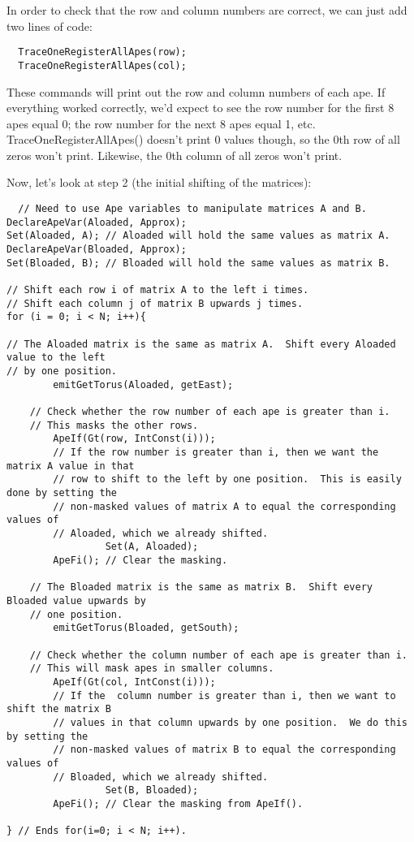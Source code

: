 \documentclass[10pt]{article}
\begin{document}
In order to check that the row and column numbers are correct, we can just add two lines of code: \par

\begin{verbatim}
  TraceOneRegisterAllApes(row);
  TraceOneRegisterAllApes(col);
\end{verbatim}

These commands will print out the row and column numbers of each ape.  If everything worked correctly, we’d expect to see the row number for the first 8 apes equal 0; the row number for the next 8 apes equal 1, etc.  TraceOneRegisterAllApes() doesn’t print 0 values though, so the 0th row of all zeros won’t print.  Likewise, the 0th column of all zeros won’t print. \par
Now, let’s look at step 2 (the initial shifting of the matrices): \par

\begin{verbatim}
  // Need to use Ape variables to manipulate matrices A and B.
DeclareApeVar(Aloaded, Approx);
Set(Aloaded, A); // Aloaded will hold the same values as matrix A.
DeclareApeVar(Bloaded, Approx);
Set(Bloaded, B); // Bloaded will hold the same values as matrix B.

// Shift each row i of matrix A to the left i times.  
// Shift each column j of matrix B upwards j times.
for (i = 0; i < N; i++){

// The Aloaded matrix is the same as matrix A.  Shift every Aloaded value to the left
// by one position. 
        emitGetTorus(Aloaded, getEast);

    // Check whether the row number of each ape is greater than i.
    // This masks the other rows.
        ApeIf(Gt(row, IntConst(i)));
        // If the row number is greater than i, then we want the matrix A value in that
        // row to shift to the left by one position.  This is easily done by setting the
        // non-masked values of matrix A to equal the corresponding values of
        // Aloaded, which we already shifted.
                 Set(A, Aloaded);
        ApeFi(); // Clear the masking.
        
    // The Bloaded matrix is the same as matrix B.  Shift every Bloaded value upwards by
    // one position.
        emitGetTorus(Bloaded, getSouth);

    // Check whether the column number of each ape is greater than i.
    // This will mask apes in smaller columns.
        ApeIf(Gt(col, IntConst(i)));
        // If the  column number is greater than i, then we want to shift the matrix B
        // values in that column upwards by one position.  We do this by setting the
        // non-masked values of matrix B to equal the corresponding values of
        // Bloaded, which we already shifted.
                 Set(B, Bloaded);
        ApeFi(); // Clear the masking from ApeIf().
        
} // Ends for(i=0; i < N; i++).
\end{verbatim}
\end{document}
